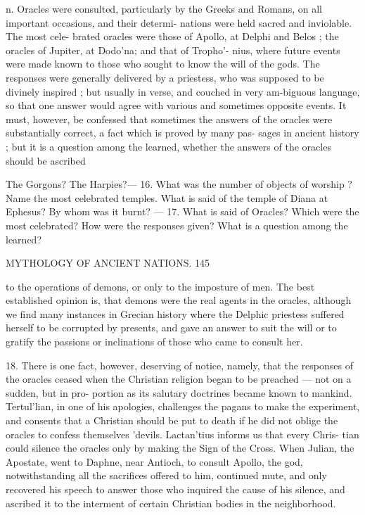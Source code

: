 \documentclass[openany,a4paper]{memoir}
\begin{document}
n. Oracles were consulted, particularly by the Greeks 
and Romans, on all important occasions, and their determi- 
nations were held sacred and inviolable. The most cele- 
brated oracles were those of Apollo, at Delphi and Belos ; 
the oracles of Jupiter, at Dodo'na; and that of Tropho'- 
nius, where future events were made known to those who 
sought to know the will of the gods. The responses were 
generally delivered by a priestess, who was supposed to be 
divinely inspired ; but usually in verse, and couched in very 
am-biguous language, so that one answer would agree with 
various and sometimes opposite events. It must, however, 
be confessed that sometimes the answers of the oracles were 
substantially correct, a fact which is proved by many pas- 
sages in ancient history ; but it is a question among the 
learned, whether the answers of the oracles should be ascribed 

The Gorgons? The Harpies?— 16. What was the number of objects 
of worship ? Name the most celebrated temples. What is said of the 
temple of Diana at Ephesus? By whom was it burnt? — 17. What is 
said of Oracles? Which were the most celebrated? How were the 
responses given? What is a question among the learned? 



MYTHOLOGY OF ANCIENT NATIONS. 145 

to the operations of demons, or only to the imposture of men. 
The best established opinion is, that demons were the real 
agents in the oracles, although we find many instances in 
Grecian history where the Delphic priestess suffered herself 
to be corrupted by presents, and gave an answer to suit the 
will or to gratify the passions or inclinations of those who 
came to consult her. 

18. There is one fact, however, deserving of notice, namely, 
that the responses of the oracles ceased when the Christian 
religion began to be preached — not on a sudden, but in pro- 
portion as its salutary doctrines became known to mankind. 
Tertul'lian, in one of his apologies, challenges the pagans 
to make the experiment, and consents that a Christian should 
be put to death if he did not oblige the oracles to confess 
themselves 'devils. Lactan'tius informs us that every Chris- 
tian could silence the oracles only by making the Sign of the 
Cross. When Julian, the Apostate, went to Daphne, near 
Antioch, to consult Apollo, the god, notwithstanding all the 
sacrifices offered to him, continued mute, and only recovered 
his speech to answer those who inquired the cause of his 
silence, and ascribed it to the interment of certain Christian 
bodies in the neighborhood. 
\end{document}
